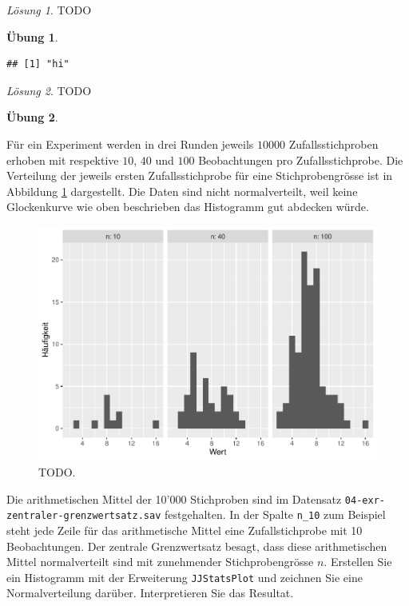 \documentclass[
]{book}
\theoremstyle{definition}
\theoremstyle{definition}
\theoremstyle{definition}
\newtheorem{exercise}{Übung}[chapter]
\theoremstyle{definition}
\theoremstyle{remark}
\newtheorem*{solution}{Lösung}
\begin{document}
\begin{solution}
TODO
\end{solution}

\begin{exercise}
\protect\hypertarget{exr:interpret-report2}{}\label{exr:interpret-report2}\leavevmode

\begin{verbatim}
## [1] "hi"
\end{verbatim}

\end{exercise}

\begin{solution}
TODO
\end{solution}

\begin{exercise}
\protect\hypertarget{exr:ki-approx-normal}{}\label{exr:ki-approx-normal}\leavevmode

Für ein Experiment werden in drei Runden jeweils \(10000\) Zufallsstichproben erhoben mit respektive \(10\), \(40\) und \(100\) Beobachtungen pro Zufallsstichprobe. Die Verteilung der jeweils ersten Zufallsstichprobe für eine Stichprobengrösse ist in Abbildung \ref{fig:ki-approx-normal1} dargestellt. Die Daten sind nicht normalverteilt, weil keine Glockenkurve wie oben beschrieben das Histogramm gut abdecken würde.

\begin{figure}
\centering
\includegraphics{aps_statistik1_files/figure-latex/ki-approx-normal1-1.pdf}
\caption{\label{fig:ki-approx-normal1}TODO.}
\end{figure}

Die arithmetischen Mittel der 10'000 Stichproben sind im Datensatz \texttt{04-exr-zentraler-grenzwertsatz.sav} festgehalten. In der Spalte \texttt{n\_10} zum Beispiel steht jede Zeile für das arithmetische Mittel eine Zufallstichprobe mit 10 Beobachtungen. Der zentrale Grenzwertsatz besagt, dass diese arithmetischen Mittel normalverteilt sind mit zunehmender Stichprobengrösse \(n\). Erstellen Sie ein Histogramm mit der Erweiterung \texttt{JJStatsPlot} und zeichnen Sie eine Normalverteilung darüber. Interpretieren Sie das Resultat.

\end{exercise}
\end{document}
